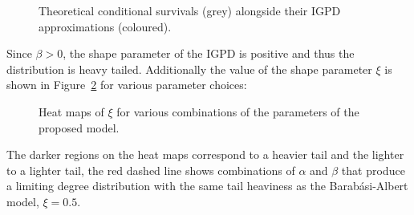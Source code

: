 \documentclass[
  sn-basic,
]{sn-jnl}
\theoremstyle{plain}
\theoremstyle{remark}
\begin{document}
\begin{figure}[H]


\caption{\label{fig-approx_surv}Theoretical conditional survivals (grey)
alongside their IGPD approximations (coloured).}

\end{figure}%

Since \(\beta>0\), the shape parameter of the IGPD is positive and thus
the distribution is heavy tailed. Additionally the value of the shape
parameter \(\xi\) is shown in Figure~\ref{fig-polyheat} for various
parameter choices:

\begin{figure}[H]


\caption{\label{fig-polyheat}Heat maps of \(\xi\) for various
combinations of the parameters of the proposed model.}

\end{figure}%

The darker regions on the heat maps correspond to a heavier tail and the
lighter to a lighter tail, the red dashed line shows combinations of
\(\alpha\) and \(\beta\) that produce a limiting degree distribution
with the same tail heaviness as the Barabási-Albert model, \(\xi=0.5\).
\end{document}
